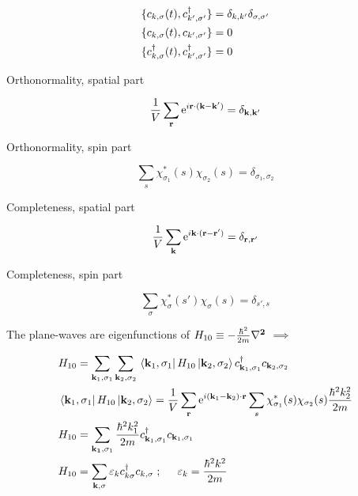 \begin{align}
	&\{c_{k,\sigma}(t), c^{\dagger}_{ k', \sigma'} \}= \delta_{k,k'}\delta_{\sigma,\sigma'}\\
	&\{c_{k,\sigma}(t), c_{ k', \sigma'} \}= 0\\
	&\{c^{\dagger}_{k,\sigma}(t), c^{\dagger}_{ k', \sigma'} \}= 0
\end{align}

\noindent Orthonormality, spatial part

\begin{equation}
	\frac{1}{V} \sum_{\vb{r}} \mathrm{e}^{i \vb{r}\cdot (\vb{k}-\vb{k}')} = \delta_{\vb{k}, \vb{k}'}
\end{equation}

\noindent Orthonormality, spin part

\begin{equation}
	\sum_s \chi_{\sigma_1}^* (s) \chi_{\sigma_2} (s) = \delta_{\sigma_1,\sigma_2}
\end{equation}

\noindent Completeness, spatial part

\begin{equation}
	\frac{1}{V} \sum_{\vb{k}} \mathrm{e}^{i \vb{k}\cdot (\vb{r}-\vb{r}')} = \delta_{\vb{r}, \vb{r}'}
\end{equation}

\noindent Completeness, spin part

\begin{equation}
	\sum_{\sigma} \chi_{\sigma}^* (s') \chi_{\sigma} (s) = \delta_{s',s}
\end{equation}

\noindent The plane-waves are eigenfunctions of $H_{10} \equiv -\frac{\hbar^2}{2m} \vb{\laplacian}$ $\implies$

\begin{align}
	& H_{10} = \sum_{\vb{k}_1, \sigma_1} \sum_{\vb{k}_2, \sigma_2} \bra*{\vb{k}_1, \sigma_1} H_{10} \ket*{\vb{k}_2, \sigma_2} c^{\dagger}_{ \vb{k}_1, \sigma_1} c_{\vb{k}_2, \sigma_2}\\
	&  \bra*{\vb{k}_1, \sigma_1} H_{10} \ket*{\vb{k}_2, \sigma_2}  = \frac{1}{V} \sum_{\vb{r}} \mathrm{e}^{i (\vb{k}_1-\vb{k}_2)\cdot \vb{r}}  \sum_s \chi_{\sigma_1}^*(s) \chi_{\sigma_2}(s) \frac{\hbar^2 k_2^2}{2m}\\
	& H_{10}= \sum_{\vb{k_1}, \sigma_1} \frac{\hbar^2 k_1^2}{2m} c^{\dagger}_{ \vb{k}_1, \sigma_1} c_{ \vb{k}_1, \sigma_1} \nonumber\\ 
	& H_{10}= \sum_{\vb{k}, \sigma} \varepsilon_k c^{\dagger}_{k \sigma} c_{ k, \sigma} \hspace{0.1cm} ; \hspace{0.5cm} \varepsilon_k = \frac{\hbar^2 k^2}{2m} \nonumber
\end{align}

